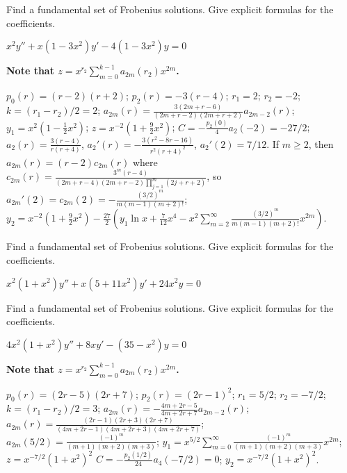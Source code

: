 \documentclass{ximera}
\begin{document}
\begin{problem}\label{exer:7.7.34}
Find
a fundamental set  of Frobenius solutions. Give explicit formulas for
the coefficients.

$x^2y''+x(1-3x^2)y'-4(1-3x^2)y=0$

\begin{solution}
    \textbf{Note that $z=x^{r_2}\sum_{m=0}^{k-1}a_{2m}(r_2)x^{2m}$.}

    $p_0(r)=(r-2)(r+2)$;
$p_2(r)=-3(r-4)$;
$r_1=2$; $r_2=-2$; $k=(r_1-r_2)/2=2$;
$a_{2m}(r)=\frac{3(2m+r-6)}{(2m+r-2)(2m+r+2)}
a_{2m-2}(r)$;
$y_1=x^2\left(1-\frac{1}{2}x^2\right)$;
$z=x^{-2}\left(1+\frac{9}{2}x^2\right)$;
$C=-\frac{p_2(0)}{4}a_2(-2)=-27/2$;
$a_2(r)=\frac{3(r-4)}{ r(r+4)}$,
$a_2'(r)=-\frac{3(r^2-8r-16)}{ r^2(r+4)^2}$,
$a_2'(2)=7/12$. If $m\geq 2$, then $a_{2m}(r)=(r-2)c_{2m}(r)$ where
$c_{2m}(r)=\frac{3^m(r-4)}{(2m+r-4)(2m+r-2)\prod_{j=1}^m(2j+r+2)}$,
so $a_{2m}'(2)=c_{2m}(2)=-\frac{\left(3/2\right)^m }{
m(m-1)(m+2)!}$;
$y_2=x^{-2}\left(1+\frac{9}{2}x^2\right)-\frac{27}{2}\left(
y_1\ln x+\frac{7}{12}x^4-x^2\sum_{m=2}^\infty\frac{\left(3/2\right)^m
}{ m(m-1)(m+2)!}x^{2m}\right)$.

\end{solution}
\end{problem}

\begin{problem}\label{exer:7.7.35}
Find
a fundamental set  of Frobenius solutions. Give explicit formulas for
the coefficients.

$x^2(1+x^2)y''+x(5+11x^2)y'+24x^2y=0$
\end{problem}

\begin{problem}\label{exer:7.7.36}
Find
a fundamental set  of Frobenius solutions. Give explicit formulas for
the coefficients.

$4x^2(1+x^2)y''+8xy'-(35-x^2)y=0$

\begin{solution}
    \textbf{Note that $z=x^{r_2}\sum_{m=0}^{k-1}a_{2m}(r_2)x^{2m}$.}

    $p_0(r)=(2r-5)(2r+7)$;
$p_2(r)=(2r-1)^2$;
$r_1=5/2$; $r_2=-7/2$; $k=(r_1-r_2)/2=3$;
$a_{2m}(r)=-\frac{4m+2r-5}{4m+2r+7}a_{2m-2}(r)$;
 $a_{2m}(r)=\frac
{(2r-1)(2r+3)(2r+7)}{(4m+2r-1)(4m+2r+3)(4m+2r+7)}$;
$a_{2m}(5/2)=\frac{(-1)^m}{(m+1)(m+2)(m+3)}$;
$y_1=x^{5/2}\sum_{m=0}^\infty\frac{(-1)^m}{(m+1)(m+2)(m+3)}x^{2m}$;
$z=x^{-7/2}(1+x^2)^2$
$C=-\frac{p_2(1/2)}{24}a_4(-7/2)=0$;
$y_2=x^{-7/2}(1+x^2)^2$.
\end{solution}
\end{problem}
\end{document}
